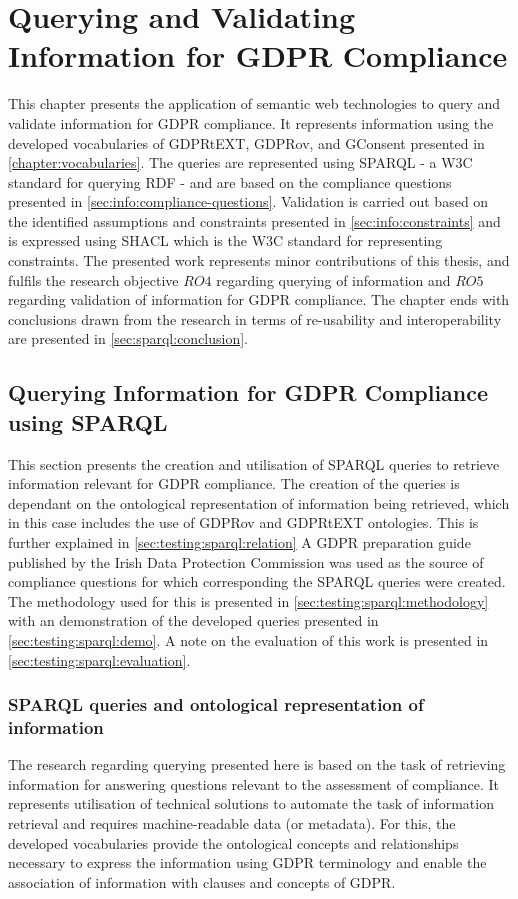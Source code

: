 \chapter{Querying and Validating Information for GDPR Compliance}
\label{chapter:testing}
This chapter presents the application of semantic web technologies to query and validate information for GDPR compliance.
It represents information using the developed vocabularies of GDPRtEXT, GDPRov, and GConsent presented in \autoref{chapter:vocabularies}.
The queries are represented using SPARQL - a W3C standard for querying RDF - and are based on the compliance questions presented in \autoref{sec:info:compliance-questions}.
Validation is carried out based on the identified assumptions and constraints presented in \autoref{sec:info:constraints} and is expressed using SHACL which is the W3C standard for representing constraints.
The presented work represents minor contributions of this thesis, and fulfils the research objective $RO4$ regarding querying of information and $RO5$ regarding validation of information for GDPR compliance.
The chapter ends with conclusions drawn from the research in terms of re-usability and interoperability are presented in \autoref{sec:sparql:conclusion}.

\section{Querying Information for GDPR Compliance using SPARQL}\label{sec:testing:sparql}
This section presents the creation and utilisation of SPARQL queries to retrieve information relevant for GDPR compliance.
The creation of the queries is dependant on the ontological representation of information being retrieved, which in this case includes the use of GDPRov and GDPRtEXT ontologies. This is further explained in \autoref{sec:testing:sparql:relation}
A GDPR preparation guide published by the Irish Data Protection Commission was used as the source of compliance questions for which corresponding the SPARQL queries were created. The methodology used for this is presented in \autoref{sec:testing:sparql:methodology} with an demonstration of the developed queries presented in \autoref{sec:testing:sparql:demo}.
A note on the evaluation of this work is presented in \autoref{sec:testing:sparql:evaluation}.

\subsection{SPARQL queries and ontological representation of information}\label{sec:testing:sparql:relation}
The research regarding querying presented here is based on the task of retrieving information for answering questions relevant to the assessment of compliance.
It represents utilisation of technical solutions to automate the task of information retrieval and requires machine-readable data (or metadata).
For this, the developed vocabularies provide the ontological concepts and relationships necessary to express the information using GDPR terminology and enable the association of information with clauses and concepts of GDPR.

